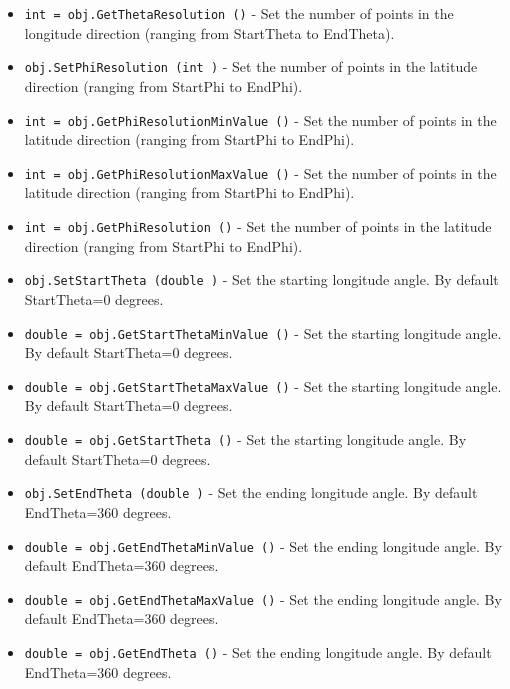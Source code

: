 \begin{itemize}
\item  \verb|int = obj.GetThetaResolution ()| -  Set the number of points in the longitude direction (ranging from
 StartTheta to EndTheta).

\item  \verb|obj.SetPhiResolution (int )| -  Set the number of points in the latitude direction (ranging
 from StartPhi to EndPhi).

\item  \verb|int = obj.GetPhiResolutionMinValue ()| -  Set the number of points in the latitude direction (ranging
 from StartPhi to EndPhi).

\item  \verb|int = obj.GetPhiResolutionMaxValue ()| -  Set the number of points in the latitude direction (ranging
 from StartPhi to EndPhi).

\item  \verb|int = obj.GetPhiResolution ()| -  Set the number of points in the latitude direction (ranging
 from StartPhi to EndPhi).

\item  \verb|obj.SetStartTheta (double )| -  Set the starting longitude angle. By default StartTheta=0 degrees.

\item  \verb|double = obj.GetStartThetaMinValue ()| -  Set the starting longitude angle. By default StartTheta=0 degrees.

\item  \verb|double = obj.GetStartThetaMaxValue ()| -  Set the starting longitude angle. By default StartTheta=0 degrees.

\item  \verb|double = obj.GetStartTheta ()| -  Set the starting longitude angle. By default StartTheta=0 degrees.

\item  \verb|obj.SetEndTheta (double )| -  Set the ending longitude angle. By default EndTheta=360 degrees.

\item  \verb|double = obj.GetEndThetaMinValue ()| -  Set the ending longitude angle. By default EndTheta=360 degrees.

\item  \verb|double = obj.GetEndThetaMaxValue ()| -  Set the ending longitude angle. By default EndTheta=360 degrees.

\item  \verb|double = obj.GetEndTheta ()| -  Set the ending longitude angle. By default EndTheta=360 degrees.


\end{itemize}
